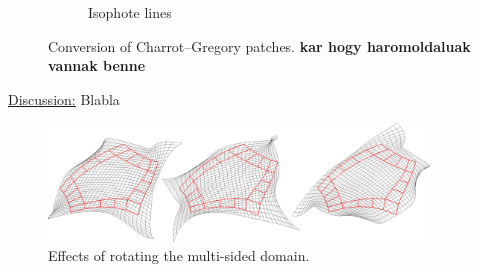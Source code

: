 \documentclass{article}
\begin{document}
\begin{figure}[h!]
\begin{subfigure}{0.23\textwidth}
    \caption{Isophote lines}
    \label{fig:trebol-iso}
  \end{subfigure}
  \caption{Conversion of Charrot--Gregory patches. \bf kar hogy haromoldaluak vannak benne}
  \label{fig:trebol}
\end{figure}

\vspace{10pt}
\noindent\underline{Discussion:}\vspace{0.2em}\newline
Blabla
\begin{figure}[h!]
  \centering
  \includegraphics[width = 0.9\textwidth]{images/rotations.png}
  \caption{Effects of rotating the multi-sided domain.}
  \label{fig:rotations}
\end{figure}
\end{document}

